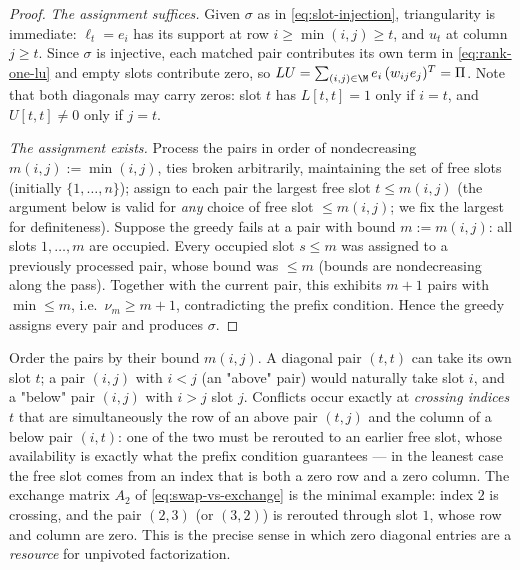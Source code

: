 \begin{proof}
  \emph{The assignment suffices.}
  Given $\sigma$ as in \cref{eq:slot-injection}, triangularity is immediate:
  $\ell_t = e_i$ has its support at row $i \ge \min(i,j) \ge t$, and $u_t$
  at column $j \ge t$.  Since $\sigma$ is injective, each matched pair
  contributes its own term in \cref{eq:rank-one-lu} and empty slots
  contribute zero, so
  $L U = \sum_{(i,j) \in \M} e_i \, (w_{ij} e_j)^T = \Pi$.  Note that both
  diagonals may carry zeros: slot $t$ has $L[t,t] = 1$ only if
  $i = t$, and $U[t,t] \neq 0$ only if $j = t$.

  \emph{The assignment exists.}
  Process the pairs in order of nondecreasing $m(i,j) := \min(i,j)$, ties
  broken arbitrarily, maintaining the set of free slots (initially
  $\{1, \ldots, n\}$); assign to each pair the largest free slot
  $t \le m(i,j)$ (the argument below is valid for \emph{any} choice of
  free slot $\le m(i,j)$; we fix the largest for definiteness).  Suppose
  the greedy fails at a pair with bound
  $m := m(i,j)$: all slots $1, \ldots, m$ are occupied.  Every occupied
  slot $s \le m$ was assigned to a previously processed pair, whose bound
  was $\le m$ (bounds are nondecreasing along the pass).  Together with the
  current pair, this exhibits $m + 1$ pairs with $\min \le m$, i.e.\
  $\nu_m \ge m + 1$, contradicting the prefix condition.  Hence the greedy
  assigns every pair and produces $\sigma$.
\end{proof}

\begin{remark}\label{rem:rerouting}
  Order the pairs by their bound $m(i,j)$.  A diagonal pair $(t,t)$ can
  take its own slot $t$; a pair $(i,j)$ with $i < j$ (an "above" pair)
  would naturally take slot $i$, and a "below" pair $(i,j)$ with $i > j$
  slot $j$.  Conflicts occur exactly at \emph{crossing indices} $t$ that
  are simultaneously the row of an above pair $(t, j)$ and the column of a
  below pair $(i, t)$: one of the two must be rerouted to an earlier free
  slot, whose availability is exactly what the prefix condition
  guarantees --- in the leanest case the free slot comes from an index that
  is both a zero row and a zero column.  The exchange matrix $A_2$ of
  \cref{eq:swap-vs-exchange} is the minimal example: index $2$ is crossing,
  and the pair $(2,3)$ (or $(3,2)$) is rerouted through slot $1$, whose row
  and column are zero.  This is the precise sense in which zero diagonal
  entries are a \emph{resource} for unpivoted factorization.
\end{remark}

